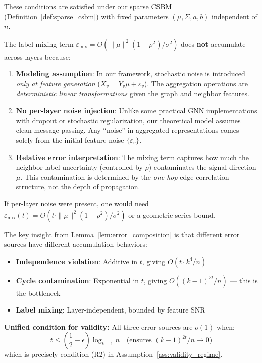 \begin{remark}
These conditions are satisfied under our sparse CSBM (Definition~\ref{def:sparse_csbm}) with fixed parameters $(\mu, \Sigma, a, b)$ independent of $n$.
\end{remark}

\begin{remark}
\label{rem:mix_layer_indep}
The label mixing term $\varepsilon_{\mathrm{mix}} = O(\|\mu\|^2(1-\rho^2)/\sigma^2)$ does \textbf{not} accumulate across layers because:
\begin{enumerate}
    \item \textbf{Modeling assumption}: In our framework, stochastic noise is introduced \textit{only at feature generation} ($X_v = Y_v\mu + \varepsilon_v$). The aggregation operations are \textit{deterministic linear transformations} given the graph and neighbor features.
    \item \textbf{No per-layer noise injection}: Unlike some practical GNN implementations with dropout or stochastic regularization, our theoretical model assumes clean message passing. Any ``noise'' in aggregated representations comes solely from the initial feature noise $\{\varepsilon_v\}$.
    \item \textbf{Relative error interpretation}: The mixing term captures how much the neighbor label uncertainty (controlled by $\rho$) contaminates the signal direction $\mu$. This contamination is determined by the \textit{one-hop} edge correlation structure, not the depth of propagation.
\end{enumerate}
If per-layer noise were present, one would need $\varepsilon_{\mathrm{mix}}(t) = O(t \cdot \|\mu\|^2(1-\rho^2)/\sigma^2)$ or a geometric series bound.
\end{remark}

\begin{remark}
\label{rem:error_accumulation}
The key insight from Lemma~\ref{lem:error_composition} is that different error sources have different accumulation behaviors:
\begin{itemize}
    \item \textbf{Independence violation}: Additive in $t$, giving $O(t \cdot k^4/n)$
    \item \textbf{Cycle contamination}: Exponential in $t$, giving $O((k-1)^{2t}/n)$ --- this is the bottleneck
    \item \textbf{Label mixing}: Layer-independent, bounded by feature SNR
\end{itemize}

\textbf{Unified condition for validity:} All three error sources are $o(1)$ when:
\begin{equation}
    t \leq \left(\frac{1}{2} - \epsilon\right) \log_{k-1} n \quad \text{(ensures } (k-1)^{2t}/n \to 0)
\end{equation}
which is precisely condition (R2) in Assumption~\ref{ass:validity_regime}.
\end{remark}

